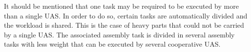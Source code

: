 \documentclass[letterpaper, 12pt, conference]{ieeeconf}    %
\begin{document}
%
%

It should be mentioned that one task may be required to be executed by more than a single UAS. In order to do so, certain tasks are automatically divided and the workload is shared. This is the case of heavy parts that could not be carried by a single UAS. The associated assembly task is divided in several assembly tasks with less weight that can be executed by several cooperative UAS.

\end{document}
